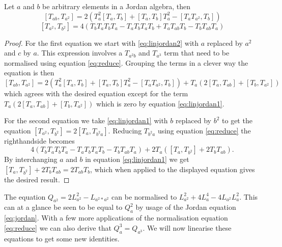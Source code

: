 \documentclass{article}
\begin{document}
\begin{lemma}
	Let $a$ and $b$ be arbitrary elements in a Jordan algebra, then
	\begin{equation}\label{eq:commuteab_aa}
		[T_{ab}, T_{a^2}] = 2(T_a^2[T_a,T_b] + [T_a,T_b]T_a^2 -[T_aT_{a^2}, T_b])
	\end{equation}
	\begin{equation}\label{eq:commuteaa_bb}
		[T_{a^2},T_{b^2}] = 4 (T_bT_aT_bT_a - T_aT_bT_aT_b + T_aT_{ab}T_b - T_bT_{ab}T_a)
	\end{equation}
\end{lemma}
\begin{proof}
	For the first equation we start with \eqref{eq:linjordan2} with $a$ replaced by $a^2$ and $c$ by $a$. This expression involves a $T_{a^2b}$ and $T_{a^3}$ term that need to be normalised using equation \eqref{eq:reduce}. Grouping the terms in a clever way the equation is then
	$$[T_{ab},T_{a^2}] = 2 (T_a^2[T_a,T_b] + [T_a,T_b]T_a^2 - [T_aT_{a^2},T_b])+ T_a(2[T_a,T_{ab}] + [T_b,T_{a^2}])$$
	which agrees with the desired equation except for the term $T_a(2[T_a,T_{ab}] + [T_b,T_{a^2}])$ which is zero by equation \eqref{eq:linjordan1}.

	For the second equation we take \eqref{eq:linjordan1} with $b$ replaced by $b^2$ to get the equation $[T_{a^2},T_{b^2}] = 2[T_a,T_{b^2a}]$. Reducing $T_{b^2a}$ using equation \eqref{eq:reduce} the righthandside becomes 
	$$4(T_b T_a T_b T_a - T_a T_bT_a T_b - T_bT_{ab}T_a) + 2T_a([T_a,T_{b^2}] + 2 T_bT_{ab}).$$ 
	By interchanging $a$ and $b$ in equation \eqref{eq:linjordan1} we get $[T_a,T_{b^2}] + 2 T_bT_{ab} = 2T_{ab}T_b$, which when applied to the displayed equation gives the desired result.
\end{proof}

The equation $Q_{a^2} = 2L_{a^2}^2 - L_{a^2*a^2}$ can be normalised to $L_{a^2}^2 + 4 L_a^4 - 4 L_{a^2}L_a^2$. This can at a glance be seen to be equal to $Q_a^2$ by usage of the Jordan equation \ref{eq:jordan}. With a few more applications of the normalisation equation \eqref{eq:reduce} we can also derive that $Q_a^3 = Q_{a^3}$. We will now linearise these equations to get some new identities.
\end{document}
